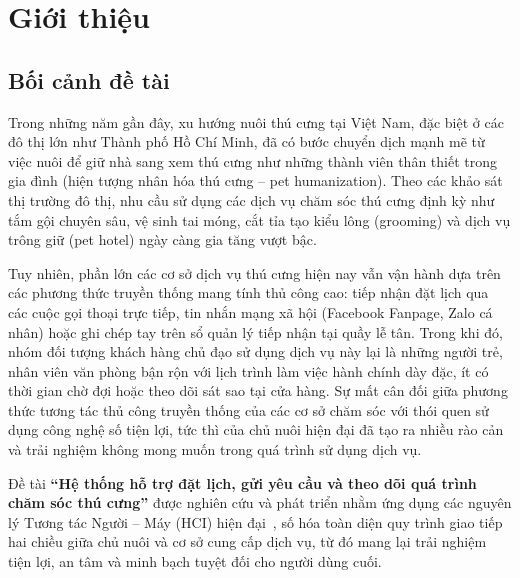 \section{Giới thiệu}

\subsection{Bối cảnh đề tài}
Trong những năm gần đây, xu hướng nuôi thú cưng tại Việt Nam, đặc biệt ở các đô thị lớn như Thành phố Hồ Chí Minh, đã có bước chuyển dịch mạnh mẽ từ việc nuôi để giữ nhà sang xem thú cưng như những thành viên thân thiết trong gia đình (hiện tượng nhân hóa thú cưng -- pet humanization). Theo các khảo sát thị trường đô thị, nhu cầu sử dụng các dịch vụ chăm sóc thú cưng định kỳ như tắm gội chuyên sâu, vệ sinh tai móng, cắt tỉa tạo kiểu lông (grooming) và dịch vụ trông giữ (pet hotel) ngày càng gia tăng vượt bậc. 

Tuy nhiên, phần lớn các cơ sở dịch vụ thú cưng hiện nay vẫn vận hành dựa trên các phương thức truyền thống mang tính thủ công cao: tiếp nhận đặt lịch qua các cuộc gọi thoại trực tiếp, tin nhắn mạng xã hội (Facebook Fanpage, Zalo cá nhân) hoặc ghi chép tay trên sổ quản lý tiếp nhận tại quầy lễ tân. Trong khi đó, nhóm đối tượng khách hàng chủ đạo sử dụng dịch vụ này lại là những người trẻ, nhân viên văn phòng bận rộn với lịch trình làm việc hành chính dày đặc, ít có thời gian chờ đợi hoặc theo dõi sát sao tại cửa hàng. Sự mất cân đối giữa phương thức tương tác thủ công truyền thống của các cơ sở chăm sóc với thói quen sử dụng công nghệ số tiện lợi, tức thì của chủ nuôi hiện đại đã tạo ra nhiều rào cản và trải nghiệm không mong muốn trong quá trình sử dụng dịch vụ.

Đề tài \textbf{``Hệ thống hỗ trợ đặt lịch, gửi yêu cầu và theo dõi quá trình chăm sóc thú cưng''} được nghiên cứu và phát triển nhằm ứng dụng các nguyên lý Tương tác Người -- Máy (HCI) hiện đại~\cite{Norman2013, Nielsen1994}, số hóa toàn diện quy trình giao tiếp hai chiều giữa chủ nuôi và cơ sở cung cấp dịch vụ, từ đó mang lại trải nghiệm tiện lợi, an tâm và minh bạch tuyệt đối cho người dùng cuối.

